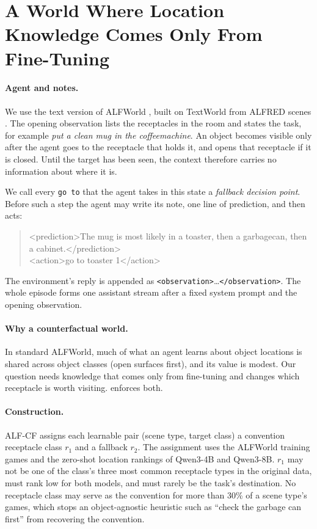 \section{A World Where Location Knowledge Comes Only From Fine-Tuning}
\label{sec:setting}

\paragraph{Agent and notes.}
We use the text version of ALFWorld \citep{shridhar2021alfworld}, built on TextWorld \citep{cote2018textworld} from ALFRED scenes \citep{shridhar2020alfred}. The opening observation lists the receptacles in the room and states the task, for example \emph{put a clean mug in the coffeemachine}. An object becomes visible only after the agent goes to the receptacle that holds it, and opens that receptacle if it is closed. Until the target has been seen, the context therefore carries no information about where it is.

We call every \texttt{go to} that the agent takes in this state a \emph{fallback decision point}. Before such a step the agent may write its note, one line of prediction, and then acts:
\begin{quote}\small\ttfamily
<prediction>The mug is most likely in a toaster, then a garbagecan, then a cabinet.</prediction>\\
<action>go to toaster 1</action>
\end{quote}
The environment's reply is appended as \texttt{<observation>}\dots\texttt{</observation>}. The whole episode forms one assistant stream after a fixed system prompt and the opening observation.

\paragraph{Why a counterfactual world.}
In standard ALFWorld, much of what an agent learns about object locations is shared across object classes (open surfaces first), and its value is modest. Our question needs knowledge that comes only from fine-tuning and changes which receptacle is worth visiting. \alfcf{} enforces both.

\paragraph{Construction.}
ALF-CF assigns each learnable pair (scene type, target class) a convention receptacle class $r_1$ and a fallback $r_2$. The assignment uses the ALFWorld training games and the zero-shot location rankings of Qwen3-4B and Qwen3-8B. $r_1$ may not be one of the class's three most common receptacle types in the original data, must rank low for both models, and must rarely be the task's destination. No receptacle class may serve as the convention for more than 30\% of a scene type's games, which stops an object-agnostic heuristic such as ``check the garbage can first'' from recovering the convention.

